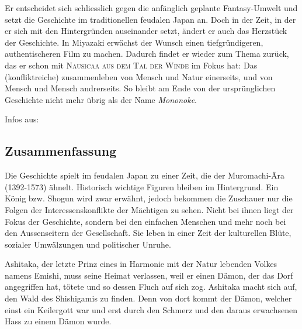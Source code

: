 Er entscheidet sich schliesslich gegen die anfänglich geplante Fantasy-Umwelt und setzt die Geschichte im traditionellen feudalen Japan an. Doch in der Zeit, in der er sich mit den Hintergründen auseinander setzt, ändert er auch das Herzstück der Geschichte. In Miyazaki erwächst der Wunsch einen tiefgründigeren, authentischeren Film zu machen. Dadurch findet er wieder zum Thema zurück, das er schon mit \textsc{Nausicaä aus dem Tal der Winde} im Fokus hat: Das (konfliktreiche) zusammenleben von Mensch und Natur einerseits, und von Mensch und Mensch andrerseits. So bleibt am Ende von der ursprünglichen Geschichte nicht mehr übrig als der Name \emph{Mononoke}. 

Infos aus:

\subsection{Zusammenfassung}
Die Geschichte spielt im feudalen Japan zu einer Zeit, die der Muromachi-Ära (1392-1573) ähnelt. Historisch wichtige Figuren bleiben im Hintergrund. Ein König bzw. Shogun wird zwar erwähnt, jedoch bekommen die Zuschauer nur die Folgen der Interessenskonflikte der Mächtigen zu sehen. Nicht bei ihnen liegt der Fokus der Geschichte, sondern bei den einfachen Menschen und mehr noch bei den Aussenseitern der Gesellschaft. Sie leben in einer Zeit der kulturellen Blüte, sozialer Umwälzungen und politischer Unruhe. 

Ashitaka, der letzte Prinz eines in Harmonie mit der Natur lebenden Volkes namens Emishi, muss seine Heimat verlassen, weil er einen Dämon, der das Dorf angegriffen hat, tötete und so dessen Fluch auf sich zog. Ashitaka macht sich auf, den Wald des Shishigamis zu finden. Denn von dort kommt der Dämon, welcher einst ein Keilergott war und erst durch den Schmerz und den daraus erwachsenen Hass zu einem Dämon wurde. 

